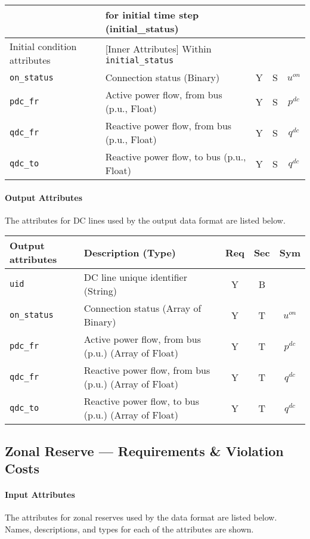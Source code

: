\documentclass{article}
\begin{document}
\begin{center}
\begin{tabular}{ l | l | c | c | c |}
       & for initial time step (initial\_status) &  &  &  \\
  \hline
  Initial condition attributes & [Inner Attributes] Within {\tt initial\_status} & & & \\
  \hline
  {\tt on\_status} & Connection status (Binary) & Y & S & $u^{on}$ \\
  {\tt pdc\_fr} & Active power flow, from bus (p.u., Float)& Y & S & $p^{dc}$ \\
  {\tt qdc\_fr} & Reactive power flow, from bus (p.u., Float)& Y & S & $q^{dc}$ \\
  {\tt qdc\_to} & Reactive power flow, to bus (p.u., Float)& Y & S & $q^{dc}$ \\
  \hline
\end{tabular}
\end{center}

\paragraph{Output Attributes}
 The attributes for DC lines
 used by the output data format are listed below.
\begin{center}
\small
\begin{tabular}{ l | l | c | c | c | }
Output attributes & Description (Type) & Req & Sec & Sym\\
\hline
  {\tt uid}    & DC line unique identifier (String)& Y & B & \\
  {\tt on\_status} & Connection status (Array of Binary) & Y & T & $u^{on}$ \\
  {\tt pdc\_fr} & Active power flow, from bus (p.u.) (Array of Float)& Y & T & $p^{dc}$ \\
  {\tt qdc\_fr} & Reactive power flow, from bus (p.u.) (Array of Float)& Y & T & $q^{dc}$ \\
  {\tt qdc\_to} & Reactive power flow, to bus (p.u.) (Array of Float)& Y & T & $q^{dc}$ \\
  \hline
\end{tabular}
\end{center}

\subsection{Zonal Reserve ---  Requirements \& Violation Costs}
\label{nom:reserves}

\paragraph{Input Attributes}
The attributes for zonal reserves
used by the data format are listed below.
Names, descriptions, and types for each of the attributes are shown.
\end{document}
